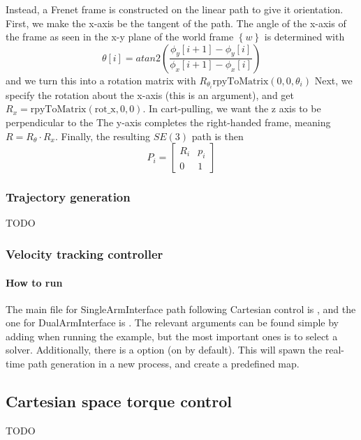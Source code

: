 Instead, a Frenet frame is constructed on the linear path to give it orientation.
First, we make the x-axis be the tangent of the path. 
The angle of the x-axis of the frame as seen in the x-y plane of
the world frame $ \left\{ w \right\}   $ is determined with
\begin{equation}
 \theta [i] = atan2 \left(  \frac{\phi_{ y } [i+1] - \phi _{ y } [i]}{\phi_{ x } [i+1] - \phi _{ x } [i]}  \right)  
\end{equation}
and we turn this into a rotation matrix with
$ R_{ \theta_{ i } }  \text{rpyToMatrix} (0,0,\theta_{ i })$
Next, we specify the rotation about the x-axis (this is an argument),
and get $ R_{ x } =  \text{rpyToMatrix} (\text{rot\_x},0,0)$.
In cart-pulling, we want the z axis to be perpendicular to the 
The y-axis completes the right-handed frame, meaning
$ R = R_{ \theta } \cdot R_{ x }  $.
Finally, the resulting $ SE (3)  $ path is then
\begin{equation}
P_{ i } = 
\begin{bmatrix} 
		R_{ i } & p_{ i } \\
		0 & 1
\end{bmatrix} 
\end{equation}


\subsubsection{Trajectory generation}
TODO

\subsubsection{Velocity tracking controller}

\begin{algorithm}[H]
\caption{cartesianTrajectoryTracking}
\begin{algorithmic}[1]
		\EndWhile
		\EndProcedure
\end{algorithmic}
\end{algorithm}


\paragraph{How to run}
The main file for SingleArmInterface path following Cartesian control is 
,
and the one for DualArmInterface is 
.
The relevant arguments can be found simple by adding
 when running the example,
but the most important ones is
 to select a solver.
Additionally, there is a 
 option (on by default).
This will spawn the real-time path generation 
in a new process, and create a predefined map.

\subsection{Cartesian space torque control}
TODO
